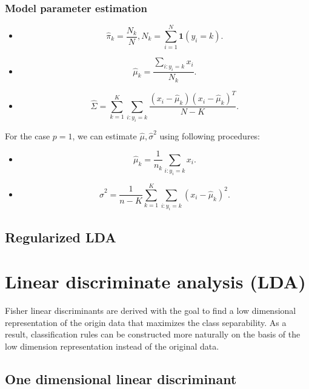 \begin{refsection}
\subsubsection{Model parameter estimation}


\begin{lemma}
	\begin{itemize}
		\item $$\hat{\pi}_k = \frac{N_k}{N}, N_k = \sum_{i=1}^N \bm{1}(y_i = k).$$
		\item $$\hat{\mu}_k = \frac{\sum_{i:y_i =k} x_i}{N_k}.$$
		\item $$\hat{\Sigma} = \sum_{k=1}^K\sum_{i:y_i=k}\frac{(x_i - \hat{\mu}_k)(x_i - \hat{\mu}_k)^T}{N-K}.$$
	\end{itemize}	
\end{lemma}




\begin{corollary}\cite[108]{murphy2012machine}
	For the case $p = 1$, we can estimate $\hat{\mu}, \hat{\sigma}^2$ using following procedures:
	\begin{itemize}
		\item $$\hat{\mu}_k = \frac{1}{n_k}\sum_{i:y_i =k} x_i.$$ 
		\item $$\hat{\sigma}^2 = \frac{1}{n-K}\sum_{k=1}^K \sum_{i:y_i =k} (x_i - \hat{\mu}_k)^2.$$ 
	\end{itemize}
\end{corollary}




\subsection{Regularized LDA}





\section{Linear discriminate analysis (LDA) }


Fisher linear discriminants are derived with the goal to find a low dimensional representation of the origin data that maximizes the class separability. As a result, classification rules can be constructed more naturally on the basis of the low dimension representation instead of the original data.
 

\subsection{One dimensional linear discriminant}

\end{refsection}
